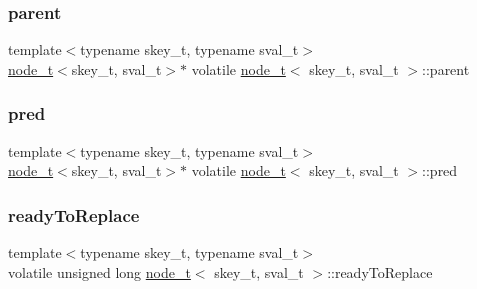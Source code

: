 \mbox{\label{structnode__t_a3ab6091479bf16f761c8cfe1d2ca78bf}} 
\subsubsection{\texorpdfstring{parent}{parent}\hspace{0.1cm}{\footnotesize\ttfamily [2/2]}}
{\footnotesize\ttfamily template$<$typename skey\+\_\+t, typename sval\+\_\+t$>$ \\
\hyperlink{structnode__t}{node\+\_\+t}$<$skey\+\_\+t, sval\+\_\+t$>$$\ast$ volatile \hyperlink{structnode__t}{node\+\_\+t}$<$ skey\+\_\+t, sval\+\_\+t $>$\+::parent}

\mbox{\label{structnode__t_a7a0e625afa9ffa7429bd055e64aedf27}} 
\subsubsection{\texorpdfstring{pred}{pred}}
{\footnotesize\ttfamily template$<$typename skey\+\_\+t, typename sval\+\_\+t$>$ \\
\hyperlink{structnode__t}{node\+\_\+t}$<$skey\+\_\+t, sval\+\_\+t$>$$\ast$ volatile \hyperlink{structnode__t}{node\+\_\+t}$<$ skey\+\_\+t, sval\+\_\+t $>$\+::pred}

\mbox{\label{structnode__t_a4a510fa3ddecdec5f97dfe6de54209b6}} 
\subsubsection{\texorpdfstring{ready\+To\+Replace}{readyToReplace}}
{\footnotesize\ttfamily template$<$typename skey\+\_\+t, typename sval\+\_\+t$>$ \\
volatile unsigned long \hyperlink{structnode__t}{node\+\_\+t}$<$ skey\+\_\+t, sval\+\_\+t $>$\+::ready\+To\+Replace}

\mbox{\label{structnode__t_a42cf1a237abbb7d2fcfe9d6536fddc97}} 
